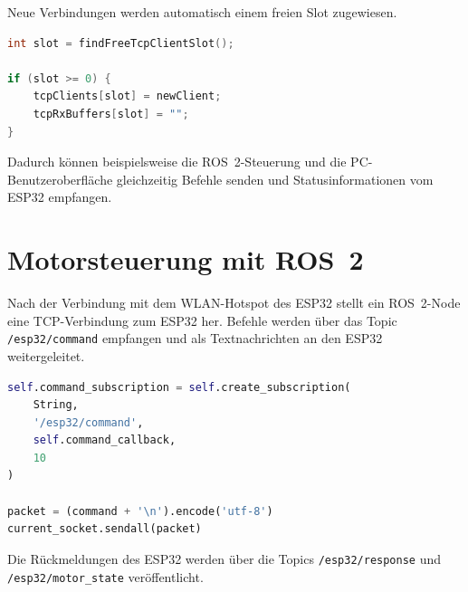 \documentclass[a4paper,12pt]{article}
\begin{document}
\newpage

Neue Verbindungen werden automatisch einem freien Slot zugewiesen.

\begin{lstlisting}[language=C++]
int slot = findFreeTcpClientSlot();

if (slot >= 0) {
    tcpClients[slot] = newClient;
    tcpRxBuffers[slot] = "";
}
\end{lstlisting}

Dadurch können beispielsweise die ROS~2-Steuerung und die PC-Benutzeroberfläche gleichzeitig Befehle senden und Statusinformationen vom ESP32 empfangen.


\section{Motorsteuerung mit ROS~2}

Nach der Verbindung mit dem WLAN-Hotspot des ESP32 stellt ein ROS~2-Node eine TCP-Verbindung zum ESP32 her. Befehle werden über das Topic \texttt{/esp32/command} empfangen und als Textnachrichten an den ESP32 weitergeleitet.

\begin{lstlisting}[language=Python]
self.command_subscription = self.create_subscription(
    String,
    '/esp32/command',
    self.command_callback,
    10
)

packet = (command + '\n').encode('utf-8')
current_socket.sendall(packet)
\end{lstlisting}

Die Rückmeldungen des ESP32 werden über die Topics \texttt{/esp32/response} und \texttt{/esp32/motor\_state} veröffentlicht.
\end{document}
